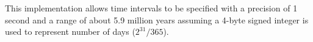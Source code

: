 
This implementation allows time intervals to be specified with a precision of 1 second and 
a range of about 5.9 million years assuming a 4-byte signed integer is used to represent 
number of days ($2^{31} / 365$).





